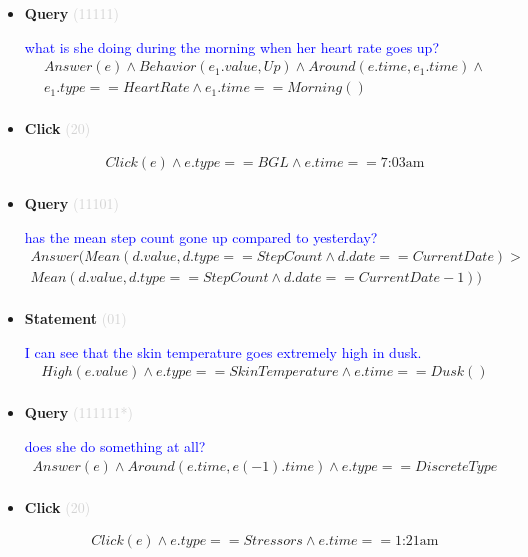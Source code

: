 \documentclass[11pt]{article}
\newcommand{\key}[1]{\textcolor{lightgray}{#1}}
\newcounter{CQuery}
\newcounter{CStatement}
\newcounter{CClick}
\begin{document}
\begin{itemize}
\item
\textbf{Query\theCQuery} \key{(11111)} \addtocounter{CQuery}{1}
\textcolor{blue}{ what is she doing during the morning when her heart rate goes up? }
\begin{multline*}
Answer(e) \wedge Behavior(e_1.value, Up) \wedge Around(e.time, e_1.time) \wedge \\ 
e_1.type==HeartRate \wedge e_1.time==Morning() \\ 
\end{multline*}


\item
\textbf{Click\theCClick} \key{(20)} \addtocounter{CClick}{1}
\textcolor{blue}{  }
\begin{multline*}
Click(e) \wedge e.type==BGL \wedge e.time==\mbox{7:03am} \\ 
\end{multline*}


\item
\textbf{Query\theCQuery} \key{(11101)} \addtocounter{CQuery}{1}
\textcolor{blue}{ has the mean step count gone up compared to yesterday? }
\begin{multline*}
Answer(Mean(d.value, d.type==StepCount \wedge d.date==CurrentDate) > \\ 
Mean(d.value, d.type==StepCount \wedge d.date==CurrentDate-1)) \\ 
\end{multline*}


\item
\textbf{Statement\theCStatement} \key{(01)} \addtocounter{CStatement}{1}
\textcolor{blue}{ I can see that the skin temperature goes extremely high in dusk. }
\begin{multline*}
High(e.value) \wedge e.type==SkinTemperature \wedge e.time==Dusk() \\ 
\end{multline*}


\item
\textbf{Query\theCQuery} \key{(111111*)} \addtocounter{CQuery}{1}
\textcolor{blue}{ does she do something at all? }
\begin{multline*}
Answer(e) \wedge Around(e.time, e(-1).time) \wedge e.type==DiscreteType \\ 
\end{multline*}


\item
\textbf{Click\theCClick} \key{(20)} \addtocounter{CClick}{1}
\textcolor{blue}{  }
\begin{multline*}
Click(e) \wedge e.type==Stressors \wedge e.time==\mbox{1:21am} \\ 
\end{multline*}



\end{itemize}
\end{document}
